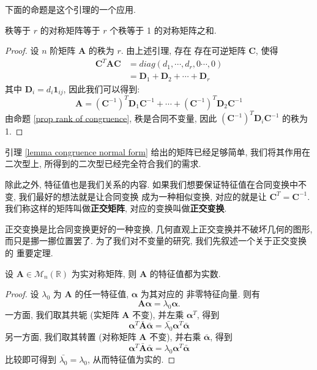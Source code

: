 \documentclass[UTF8]{book}
\begin{document}
下面的命题是这个引理的一个应用. 

\begin{proposition}
    秩等于 $r$ 的对称矩阵等于 $r$ 个秩等于 1 的对称矩阵之和. 
\end{proposition}

\begin{proof}
    设 $n$ 阶矩阵 $\boldsymbol{A}$ 的秩为 $r$. 
    由上述引理, 存在 存在可逆矩阵 $\boldsymbol{C}$, 使得 
    $$\begin{aligned}
    \boldsymbol{C}^T\boldsymbol{A}\boldsymbol{C} &= 
    diag(d_1,\cdots,d_r,0\cdots,0) \\
    &= \boldsymbol{D}_1 + \boldsymbol{D}_2 + \cdots + \boldsymbol{D}_r
    \end{aligned}$$
    其中 $\boldsymbol{D}_i = d_i\boldsymbol{1}_{ij}$, 
    因此我们可以得到: 
    $$ \boldsymbol{A} = 
    (\boldsymbol{C}^{-1})^T\boldsymbol{D}_1\boldsymbol{C}^{-1} + \cdots + 
    (\boldsymbol{C}^{-1})^T\boldsymbol{D}_2\boldsymbol{C}^{-1}
    $$
    由命题 \ref{prop rank of congruence}, 秩是合同不变量, 
    因此 $ (\boldsymbol{C}^{-1})^T\boldsymbol{D}_i\boldsymbol{C}^{-1} $ 
    的秩为1. 
\end{proof}

引理 \ref{lemma congruence normal form} 给出的矩阵已经足够简单, 
我们将其作用在二次型上, 所得到的二次型已经完全符合我们的需求. 

除此之外, 特征值也是我们关系的内容. 
如果我们想要保证特征值在合同变换中不变, 我们最好的想法就是让合同变换
成为一种相似变换, 对应的就是让 $\boldsymbol{C}^T = \boldsymbol{C}^{-1}$. 
我们称这样的矩阵叫做\textbf{正交矩阵}, 对应的变换叫做\textbf{正交变换}. 

正交变换是比合同变换更好的一种变换, 几何直观上正交变换并不破坏几何的图形, 
而只是挪一挪位置罢了. 为了我们对不变量的研究, 我们先叙述一个关于正交变换的
重要定理. 

\begin{lemma} \label{lemma eigen of symmetric}
    设 $\boldsymbol{A}\in \mathcal{M}_n(\mathbb{R})$ 为实对称矩阵, 
    则 $\boldsymbol{A}$ 的特征值都为实数. 
\end{lemma}

\begin{proof}
    设 $\lambda_0$ 为 $\boldsymbol{A}$ 的任一特征值, $\boldsymbol{\alpha}$ 为其对应的
    非零特征向量. 则有 $$ \boldsymbol{A}\boldsymbol{\alpha} = 
    \lambda_0\boldsymbol{\alpha}.$$
    一方面, 我们取其共轭 (实矩阵 $\boldsymbol{A}$ 不变), 
    并左乘 $\boldsymbol{\alpha}^T$, 得到
    $$ \boldsymbol{\alpha}^T \bar{\boldsymbol{A}}\bar{\boldsymbol{\alpha}}
    = \bar{\lambda_0}\boldsymbol{\alpha}^T \bar{\boldsymbol{\alpha}} $$
    另一方面, 我们取其转置 (对称矩阵 $\boldsymbol{A}$ 不变), 
    并右乘 $\bar{\boldsymbol{\alpha}}$, 得到
    $$ \boldsymbol{\alpha}^T \bar{\boldsymbol{A}}\bar{\boldsymbol{\alpha}}
    = \lambda_0\boldsymbol{\alpha}^T \bar{\boldsymbol{\alpha}} $$
    比较即可得到 $\bar{\lambda_0} = \lambda_0$, 从而特征值为实的.
\end{proof}
\end{document}
